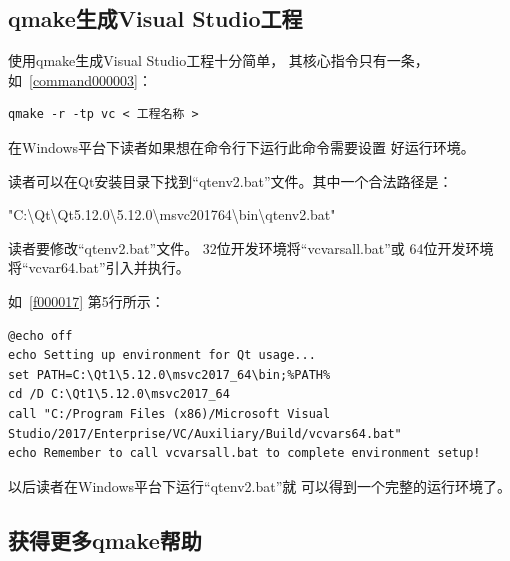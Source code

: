 \FloatBarrier
\subsection{
qmake生成Visual Studio工程
}\label{ss000910}

使用qmake生成Visual Studio工程十分简单，
其核心指令只有一条，
如\commandnumbernameone\ \ref{command000003}：

\FloatBarrier
{}\label{command000003}    %
\begin{lstlisting}[caption=GoodLuck,
title=\commandnumbernameone \thecommandnumber
]
qmake -r -tp vc < 工程名称 >
\end{lstlisting}          %


在Windows平台下读者如果想在命令行下运行此命令需要设置
好运行环境。


读者可以在Qt安装目录下找到“qtenv2.bat”文件。其中一个合法路径是：
\begin{littlelongworld}
"C:\textbackslash{}Qt\textbackslash{}Qt5.12.0\textbackslash{}5.12.0\textbackslash{}msvc2017\underline{\hspace{0.5em}}64\textbackslash{}bin\textbackslash{}qtenv2.bat"
\end{littlelongworld}

读者要修改“qtenv2.bat”文件。
32位开发环境将“vcvarsall.bat”或
64位开发环境将“vcvar64.bat”引入并执行。

如\lstlistingname\ \ref{f000017}
第5行所示：
\FloatBarrier
\begin{lstlisting}[label=f000017,
caption=GoodLuck,
title=\lstlistingname\ \thelstlisting
]
@echo off
echo Setting up environment for Qt usage...
set PATH=C:\Qt1\5.12.0\msvc2017_64\bin;%PATH%
cd /D C:\Qt1\5.12.0\msvc2017_64
call "C:/Program Files (x86)/Microsoft Visual Studio/2017/Enterprise/VC/Auxiliary/Build/vcvars64.bat"
echo Remember to call vcvarsall.bat to complete environment setup!
\end{lstlisting}          %

以后读者在Windows平台下运行“qtenv2.bat”就
可以得到一个完整的运行环境了。

\FloatBarrier
\subsection{
获得更多qmake帮助
}\label{ss000a10}


